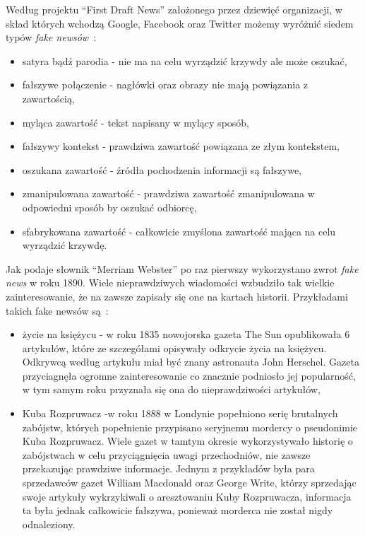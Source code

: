 Według projektu ``First Draft News'' założonego przez dziewięć organizacji, 
w skład których wchodzą Google, Facebook oraz Twitter 
możemy wyróżnić siedem typów \textit{fake newsów}~\cite{TypesOfFakeNews}:
\begin{itemize}
    \item satyra bądź parodia - nie ma na celu wyrządzić krzywdy ale może oszukać,
    \item fałszywe połączenie - nagłówki oraz obrazy nie mają powiązania z zawartością,
    \item myląca zawartość - tekst napisany w mylący sposób,
    \item fałszywy kontekst - prawdziwa zawartość powiązana ze złym kontekstem,
    \item oszukana zawartość - źródła pochodzenia informacji są fałszywe,
    \item zmanipulowana zawartość - prawdziwa zawartość zmanipulowana w odpowiedni sposób by oszukać odbiorcę,
    \item sfabrykowana zawartość - całkowicie zmyślona zawartość mająca na celu wyrządzić krzywdę.
\end{itemize}
Jak podaje słownik ``Merriam Webster'' po raz pierwszy wykorzystano zwrot
\textit{fake news} w roku 1890. Wiele nieprawdziwych wiadomości wzbudziło tak
wielkie zainteresowanie, że na zawsze zapisały się one na kartach historii. Przykładami takich fake newsów są~\cite{examplesoffakenews}:
\begin{itemize}
    \item życie na księżycu - w roku 1835 nowojorska gazeta The Sun opublikowała 6 artykułów, które ze szczegółami
    opisywały odkrycie życia na księżycu. Odkrywcą według artykułu miał być znany astronauta John Herschel.
    Gazeta przyciagnęła ogromne zainteresowanie co znacznie podniosło jej popularność, w tym samym roku przyznała się ona do 
    nieprawdziwości artykułów,
    \item  Kuba Rozpruwacz -w roku 1888 w Londynie popełniono serię brutalnych zabójstw, których popełnienie przypisano 
    seryjnemu mordercy o pseudonimie Kuba Rozpruwacz. Wiele gazet w tamtym okresie wykorzystywało historię o zabójstwach 
    w celu przyciągnięcia uwagi przechodniów, nie zawsze przekazując prawdziwe informacje. Jednym z przykładów była para 
    sprzedawców gazet William Macdonald oraz George Write, którzy sprzedając swoje artykuły wykrzykiwali o aresztowaniu
    Kuby Rozpruwacza, informacja ta była jednak całkowicie fałszywa, ponieważ morderca nie został nigdy odnaleziony.
\end{itemize}


